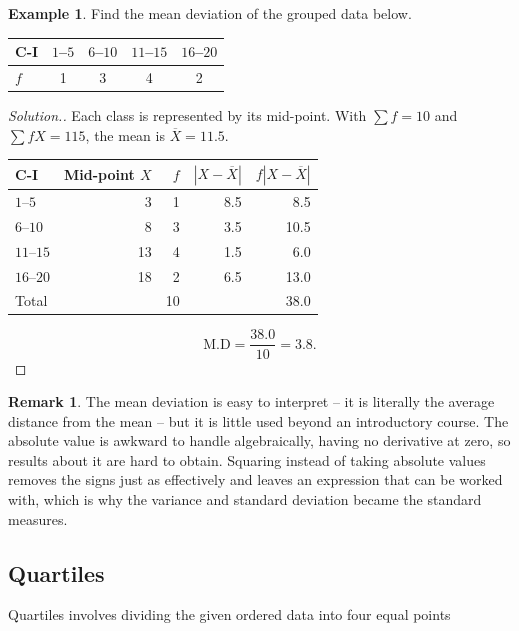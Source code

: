 \documentclass[11pt,a4paper]{article}
\theoremstyle{definition}
\newtheorem{example}[thm]{Example}
\newtheorem{remark}[thm]{Remark}
\newenvironment{solution}
  {\renewcommand{\qedsymbol}{}\begin{proof}[\textit{Solution}.]}
  {\end{proof}}
\begin{document}
\begin{example}
Find the mean deviation of the grouped data below.
\begin{table}[H]
\centering
\begin{tabular}{lcccc}
C-I & $1$--$5$ & $6$--$10$ & $11$--$15$ & $16$--$20$\\
\hline
$f$ & 1 & 3 & 4 & 2\\
\end{tabular}
\end{table}
\end{example}

\begin{solution}
Each class is represented by its mid-point. With $\sum f=10$ and $\sum fX=115$, the mean is
$\overline{X}=11.5$.
\begin{table}[H]
\centering
\begin{tabular}{lrrrr}
C-I & Mid-point $X$ & $f$ & $|X-\overline{X}|$ & $f|X-\overline{X}|$\\
\hline
$1$--$5$   & 3  & 1 & 8.5 & 8.5\\
$6$--$10$  & 8  & 3 & 3.5 & 10.5\\
$11$--$15$ & 13 & 4 & 1.5 & 6.0\\
$16$--$20$ & 18 & 2 & 6.5 & 13.0\\
\hline
Total      &    & 10 &    & 38.0\\
\end{tabular}
\end{table}
\[\text{M.D}=\frac{38.0}{10}=3.8.\]
\end{solution}

\begin{remark}
The mean deviation is easy to interpret -- it is literally the average distance from the
mean -- but it is little used beyond an introductory course. The absolute value is awkward
to handle algebraically, having no derivative at zero, so results about it are hard to
obtain. Squaring instead of taking absolute values removes the signs just as effectively
and leaves an expression that can be worked with, which is why the variance and standard
deviation became the standard measures.
\end{remark}

\subsection{Quartiles}

Quartiles involves dividing the given ordered data into four equal points
\end{document}

